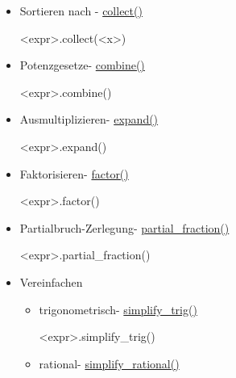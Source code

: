 \documentclass[a4paper,9pt,DIV15,twocolumn]{scrartcl}
\begin{document}
  \begin{itemize}
      \item Sortieren nach - \href{https://sage.math.uni-goettingen.de/doc/static/reference/sage/symbolic/expression.html?highlight=simplify_full#sage.symbolic.expression.Expression.collect}{collect()}
       \begin{sagein}
<expr>.collect(<x>)  
       \end{sagein}
   \item  Potenzgesetze- \href{https://sage.math.uni-goettingen.de/doc/static/reference/sage/symbolic/expression.html?highlight=simplify_full#sage.symbolic.expression.Expression.combine}{combine()}
       \begin{sagein}
<expr>.combine() 
       \end{sagein}
   \item Ausmultiplizieren- \href{https://sage.math.uni-goettingen.de/doc/static/reference/sage/symbolic/expression.html?highlight=simplify_full#sage.symbolic.expression.Expression.expand}{expand()}
       \begin{sagein}
<expr>.expand()  
       \end{sagein}
   \item Faktorisieren- \href{https://sage.math.uni-goettingen.de/doc/static/reference/sage/symbolic/expression.html?highlight=simplify_full#sage.symbolic.expression.Expression.factor}{factor()}
       \begin{sagein}
<expr>.factor()  
       \end{sagein}
   \item Partialbruch-Zerlegung- \href{https://sage.math.uni-goettingen.de/doc/static/reference/sage/symbolic/expression.html?highlight=simplify_full#sage.symbolic.expression.Expression.partial_fraction}{partial\_fraction()}
       \begin{sagein}
<expr>.partial_fraction()
       \end{sagein}
   \item Vereinfachen
   \begin{itemize}
       \item  trigonometrisch- \href{https://sage.math.uni-goettingen.de/doc/static/reference/sage/symbolic/expression.html?highlight=simplify_full#sage.symbolic.expression.Expression.simplify_trig}{simplify\_trig()}
       \begin{sagein}
<expr>.simplify_trig() 
       \end{sagein}
        \item rational- \href{https://sage.math.uni-goettingen.de/doc/static/reference/sage/symbolic/expression.html?highlight=simplify_full#sage.symbolic.expression.Expression.simplify_rational}{simplify\_rational()}

\end{itemize}
\end{itemize}
\end{document}
